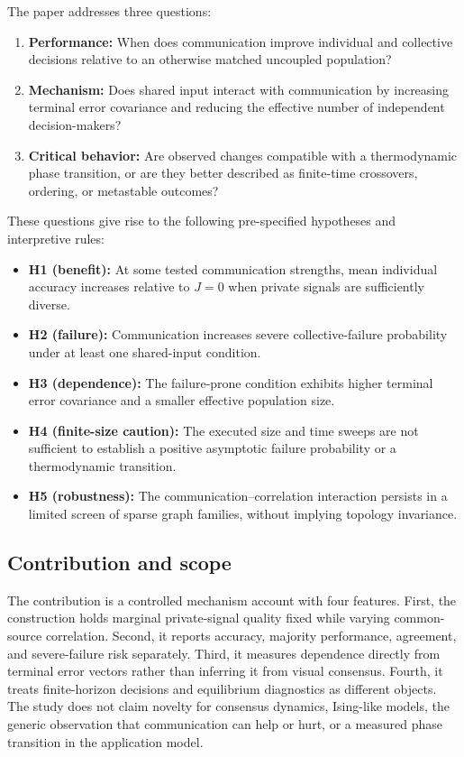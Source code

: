 \documentclass[11pt,a4paper]{article}
\begin{document}
The paper addresses three questions:

\begin{enumerate}
  \item \textbf{Performance:} When does communication improve individual and collective decisions relative to an otherwise matched uncoupled population?
  \item \textbf{Mechanism:} Does shared input interact with communication by increasing terminal error covariance and reducing the effective number of independent decision-makers?
  \item \textbf{Critical behavior:} Are observed changes compatible with a thermodynamic phase transition, or are they better described as finite-time crossovers, ordering, or metastable outcomes?
\end{enumerate}

These questions give rise to the following pre-specified hypotheses and interpretive rules:

\begin{itemize}
  \item \textbf{H1 (benefit):} At some tested communication strengths, mean individual accuracy increases relative to $J=0$ when private signals are sufficiently diverse.
  \item \textbf{H2 (failure):} Communication increases severe collective-failure probability under at least one shared-input condition.
  \item \textbf{H3 (dependence):} The failure-prone condition exhibits higher terminal error covariance and a smaller effective population size.
  \item \textbf{H4 (finite-size caution):} The executed size and time sweeps are not sufficient to establish a positive asymptotic failure probability or a thermodynamic transition.
  \item \textbf{H5 (robustness):} The communication--correlation interaction persists in a limited screen of sparse graph families, without implying topology invariance.
\end{itemize}

\subsection{Contribution and scope}

The contribution is a controlled mechanism account with four features. First, the construction holds marginal private-signal quality fixed while varying common-source correlation. Second, it reports accuracy, majority performance, agreement, and severe-failure risk separately. Third, it measures dependence directly from terminal error vectors rather than inferring it from visual consensus. Fourth, it treats finite-horizon decisions and equilibrium diagnostics as different objects. The study does not claim novelty for consensus dynamics, Ising-like models, the generic observation that communication can help or hurt, or a measured phase transition in the application model.
\end{document}

